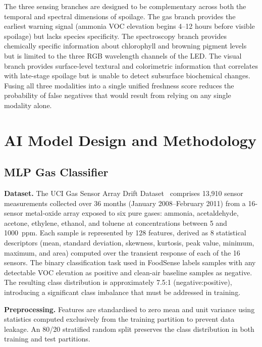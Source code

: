 \documentclass{ieeeaccess}
\begin{document}
The three sensing branches are designed to be complementary across both the temporal and spectral dimensions of spoilage. The gas branch provides the earliest warning signal (ammonia VOC elevation begins 4--12 hours before visible spoilage) but lacks species specificity. The spectroscopy branch provides chemically specific information about chlorophyll and browning pigment levels but is limited to the three RGB wavelength channels of the LED. The visual branch provides surface-level textural and colorimetric information that correlates with late-stage spoilage but is unable to detect subsurface biochemical changes. Fusing all three modalities into a single unified freshness score reduces the probability of false negatives that would result from relying on any single modality alone.

\section{AI Model Design and Methodology}
\label{sec:models}

\subsection{MLP Gas Classifier}

\textbf{Dataset.} The UCI Gas Sensor Array Drift Dataset~\cite{Vergara2012} comprises 13,910 sensor measurements collected over 36 months (January 2008--February 2011) from a 16-sensor metal-oxide array exposed to six pure gases: ammonia, acetaldehyde, acetone, ethylene, ethanol, and toluene at concentrations between 5 and 1000~ppm. Each sample is represented by 128 features, derived as 8 statistical descriptors (mean, standard deviation, skewness, kurtosis, peak value, minimum, maximum, and area) computed over the transient response of each of the 16 sensors. The binary classification task used in FoodSense labels samples with any detectable VOC elevation as positive and clean-air baseline samples as negative. The resulting class distribution is approximately 7.5:1 (negative:positive), introducing a significant class imbalance that must be addressed in training.

\textbf{Preprocessing.} Features are standardised to zero mean and unit variance using statistics computed exclusively from the training partition to prevent data leakage. An 80/20 stratified random split preserves the class distribution in both training and test partitions.
\end{document}
